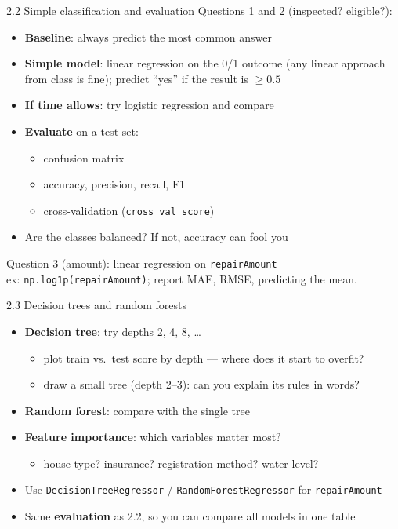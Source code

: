 \documentclass[aspectratio=43,11pt]{beamer}
\begin{document}
\begin{frame}{2.2 Simple classification and evaluation}
  Questions 1 and 2 (inspected? eligible?):
  \vspace{0.4em}
  \begin{itemize}
    \item \textbf{Baseline}: always predict the most common answer
    \item \textbf{Simple model}: linear regression on the 0/1 outcome
          (any linear approach from class is fine); predict ``yes''
          if the result is $\ge 0.5$
    \item \textbf{If time allows}: try logistic regression and compare
    \item \textbf{Evaluate} on a test set:
      \begin{itemize}
        \item confusion matrix
        \item accuracy, precision, recall, F1
        \item cross-validation (\texttt{cross\_val\_score})
      \end{itemize}
    \item Are the classes balanced? If not, accuracy can fool you
  \end{itemize}
  \vspace{0.4em}
  Question 3 (amount): linear regression on \texttt{repairAmount}\\
  {\footnotesize ex: \texttt{np.log1p(repairAmount)}; report MAE, RMSE, predicting the mean.}
\end{frame}

\begin{frame}{2.3 Decision trees and random forests}
  \begin{itemize}
    \item \textbf{Decision tree}: try depths 2, 4, 8, \dots
      \begin{itemize}
        \item plot train vs.\ test score by depth --- where does it start to overfit?
        \item draw a small tree (depth 2--3): can you explain its rules in words?
      \end{itemize}
    \item \textbf{Random forest}: compare with the single tree
    \item \textbf{Feature importance}: which variables matter most?
      \begin{itemize}
        \item house type? insurance? registration method? water level?
      \end{itemize}
    \item Use \texttt{DecisionTreeRegressor} / \texttt{RandomForestRegressor}
          for \texttt{repairAmount}
    \item Same \textbf{evaluation} as 2.2, so you can compare all models in one table
  \end{itemize}
\end{frame}
\end{document}
